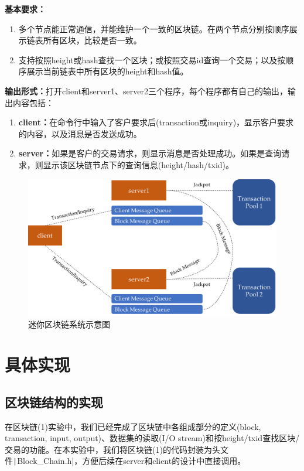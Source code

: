 \documentclass[10pt,a4paper]{article}
\begin{document}
    \noindent \textbf{基本要求：}
    \begin{enumerate}
        \item 多个节点能正常通信，并能维护一个一致的区块链。在两个节点分别按顺序展示链表所有区块，比较是否一致。
        \item 支持按照height或hash查找一个区块；或按照交易id查询一个交易；以及按顺序展示当前链表中所有区块的height和hash值。
    \end{enumerate}
    \noindent \textbf{输出形式：}打开client和server1、server2三个程序，每个程序都有自己的输出，输出内容包括：
    \begin{enumerate}
        \item \textbf{client：}在命令行中输入了客户要求后(transaction或inquiry)，显示客户要求的内容，以及消息是否发送成功。
        \item \textbf{server：}如果是客户的交易请求，则显示消息是否处理成功。如果是查询请求，则显示该区块链节点下的查询信息(height/hash/txid)。
    \end{enumerate}
    \begin{figure}[H]
        \centering
            \includegraphics[scale = 0.6]{microBlockChainSystem.pdf}
        \caption{迷你区块链系统示意图}
    \end{figure}
    \newpage
    \section{具体实现}
    \subsection{区块链结构的实现}
    在区块链(1)实验中，我们已经完成了区块链中各组成部分的定义(block, transaction, input, output)、数据集的读取(I/O stream)和按height/txid查找区块/交易的功能。在本实验中，我们将区块链(1)的代码封装为头文件\texttt|Block_Chain.h|，方便后续在server和client的设计中直接调用。
\end{document}

